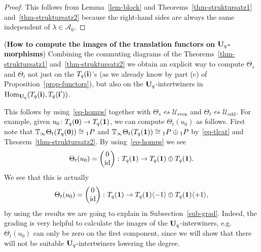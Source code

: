 \begin{proof}
This follows from Lemma~\ref{lem-block} 
and Theorems~\ref{thm-struktursatz1} 
and~\ref{thm-struktursatz2} because the 
right-hand sides are always the same independent of $\lambda\in\mathcal A_0$.
\end{proof}



\begin{ex}(\textbf{How to compute the images of the translation functors on $\boldsymbol{\mathrm{U}}_q$-morphisms})\label{ex-howtofunctor}
Combining the commuting diagrams of the 
Theorems~\ref{thm-struktursatz1} and~\ref{thm-struktursatz2} 
we obtain an explicit way to compute $\Theta_s$ and $\Theta_t$ 
not just on the $T_q({\boldsymbol{\mathrm{i}}})$'s (as we already know by part (c) 
of Proposition~\ref{prop-functors}), but also 
on the $\boldsymbol{\mathrm{U}}_q$-intertwiners in $\mathrm{Hom}_{\boldsymbol{\mathrm{U}}_q}(T_q({\boldsymbol{\mathrm{i}}}),T_q({\boldsymbol{\mathrm{i}}^{\prime}}))$.



This follows by using~\eqref{eq-homps} together 
with $\Theta_s\leftrightsquigarrow \mathcal U_{\mathrm{even}}$ 
and $\Theta_t\leftrightsquigarrow \mathcal U_{\mathrm{odd}}$. 
For example, given $u_0\colon T_q({\boldsymbol{0}})\to T_q({\boldsymbol{1}})$, we can 
compute $\Theta_t(u_0)$ as follows. First note that 
$\mathbb{T}_{\infty}\Theta_t(T_q({\boldsymbol{0}}))\cong {}_1P$ and $\mathbb{T}_{\infty}\Theta_t(T_q({\boldsymbol{1}}))\cong {}_1P\oplus {}_1P$ by~\eqref{eq-tlcat} and Theorem~\ref{thm-struktursatz2}. By using~\eqref{eq-homps} 
we see
\[
\Theta_t(u_0)=\begin{pmatrix}
 0 \\
 \mathrm{id}
\end{pmatrix}\colon T_q({\boldsymbol{1}})\to T_q({\boldsymbol{1}})\oplus T_q({\boldsymbol{1}}).
\]
We see that this is actually
\[
\Theta_t(u_0)=\begin{pmatrix}
 0 \\
 \mathrm{id} 
\end{pmatrix}\colon T_q({\boldsymbol{1}})\to T_q({\boldsymbol{1}})\langle-1\rangle\oplus T_q({\boldsymbol{1}})\langle+1\rangle,
\]
by using the results we are going to explain in Subsection~\ref{sub-grad}. Indeed, 
the grading is very helpful to calculate the images of the $\boldsymbol{\mathrm{U}}_q$-interwiners, e.g. 
$\Theta_t(u_0)$ can only be zero on the first component, since we will show 
that there will not be  suitable $\boldsymbol{\mathrm{U}}_q$-intertwiners lowering the degree.
\end{ex}



